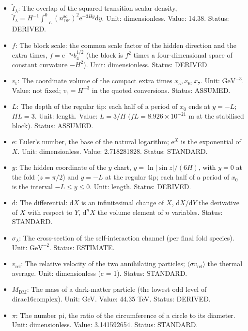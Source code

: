\documentclass[
  10pt,
]{article}
\begin{document}
\begin{itemize}
  Unit: GeV (1/length). Value: 14.296 TeV (from the fit of
  \(m_{\mathrm{W}}\) and \(\rho_{\mathrm{EW},0}\)). Status: AUTHOR.
\item
  \(\tilde I_\lambda\): The overlap of the squared transition scalar
  density,
  \(\tilde I_\lambda = H^{-1}\int_{-L}^{0}(n^{\mathrm{sc}}_{\mathrm{DF}})^2\mathrm{e}^{-3Hy}\mathrm{d}y\).
  Unit: dimensionless. Value: 14.38. Status: DERIVED.
\item
  \(f\): The block scale: the common scale factor of the hidden
  direction and the extra times, \(f = \mathrm{e}^{-a_4}b_4^{1/2}\) (the
  block is \(f^2\) times a four-dimensional space of constant curvature
  \(-H^2\)). Unit: dimensionless. Status: DERIVED.
\item
  \(v_{\mathrm{t}}\): The coordinate volume of the compact extra times
  \(x_5, x_6, x_7\). Unit: \(\mathrm{GeV}^{-3}\). Value: not fixed;
  \(v_{\mathrm{t}} = H^{-3}\) in the quoted conversions. Status:
  ASSUMED.
\item
  \(L\): The depth of the regular tip: each half of a period of \(x_0\)
  ends at \(y = -L\); \(HL = 3\). Unit: length. Value: \(L = 3/H\)
  (\(fL = 8.926\times10^{-21}\) m at the stabilised block). Status:
  ASSUMED.
\item
  \(\mathrm{e}\): Euler's number, the base of the natural logarithm;
  \(\mathrm{e}^{X}\) is the exponential of \(X\). Unit: dimensionless.
  Value: 2.718281828. Status: STANDARD.
\item
  \(y\): The hidden coordinate of the \(y\) chart,
  \(y = \ln\lvert\sin z\rvert/(6H)\), with \(y = 0\) at the fold
  (\(z = \pi/2\)) and \(y = -L\) at the regular tip; each half of a
  period of \(x_0\) is the interval \(-L \le y \le 0\). Unit: length.
  Status: DERIVED.
\item
  \(\mathrm{d}\): The differential: \(\mathrm{d}X\) is an infinitesimal
  change of \(X\), \(\mathrm{d}X/\mathrm{d}Y\) the derivative of \(X\)
  with respect to \(Y\), \(\mathrm{d}^nX\) the volume element of \(n\)
  variables. Status: STANDARD.
\item
  \(\sigma_\lambda\): The cross-section of the self-interaction channel
  (per final fold species). Unit: \(\mathrm{GeV}^{-2}\). Status:
  ESTIMATE.
\item
  \(v_{\mathrm{rel}}\): The relative velocity of the two annihilating
  particles; \(\langle\sigma v_{\mathrm{rel}}\rangle\) the thermal
  average. Unit: dimensionless (c = 1). Status: STANDARD.
\item
  \(M_{\mathrm{DM}}\): The mass of a dark-matter particle (the lowest
  odd level of dirac16complex). Unit: GeV. Value: 44.35 TeV. Status:
  DERIVED.
\item
  \(\pi\): The number pi, the ratio of the circumference of a circle to
  its diameter. Unit: dimensionless. Value: 3.141592654. Status:
  STANDARD.
\end{itemize}
\end{document}
